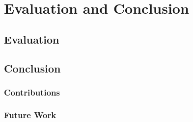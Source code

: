\documentclass[12pt,twoside]{report}
\begin{document}
\part{Evaluation and Conclusion}

\chapter{Evaluation}

\chapter{Conclusion}

\section{Contributions}

\section{Future Work}

%

%

%

%

\clearpage



\end{document}
